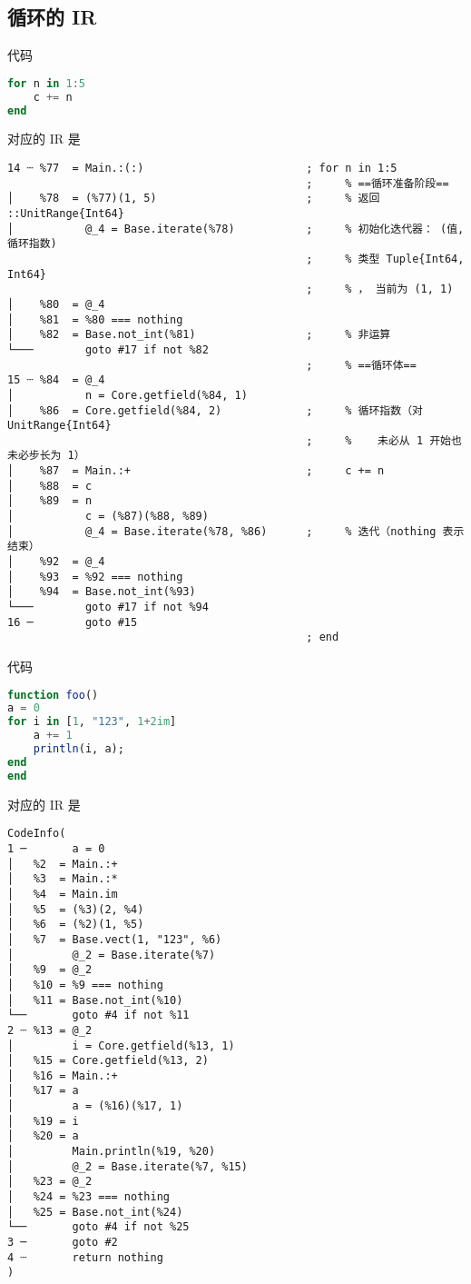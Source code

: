 \subsection{循环的 IR}
代码
\begin{lstlisting}[language=julia]
for n in 1:5
    c += n
end
\end{lstlisting}
对应的 IR 是
\begin{lstlisting}[language=none]
14 ┄ %77  = Main.:(:)                         ; for n in 1:5
                                              ;     % ==循环准备阶段==
│    %78  = (%77)(1, 5)                       ;     % 返回 ::UnitRange{Int64}
│           @_4 = Base.iterate(%78)           ;     % 初始化迭代器： (值, 循环指数)
                                              ;     % 类型 Tuple{Int64, Int64}
                                              ;     % ， 当前为 (1, 1)
│    %80  = @_4
│    %81  = %80 === nothing
│    %82  = Base.not_int(%81)                 ;     % 非运算
└───        goto #17 if not %82
                                              ;     % ==循环体==
15 ┄ %84  = @_4
│           n = Core.getfield(%84, 1)
│    %86  = Core.getfield(%84, 2)             ;     % 循环指数（对 UnitRange{Int64}
                                              ;     %    未必从 1 开始也未必步长为 1）
│    %87  = Main.:+                           ;     c += n
│    %88  = c
│    %89  = n
│           c = (%87)(%88, %89)
│           @_4 = Base.iterate(%78, %86)      ;     % 迭代（nothing 表示结束）
│    %92  = @_4
│    %93  = %92 === nothing
│    %94  = Base.not_int(%93)
└───        goto #17 if not %94
16 ─        goto #15
                                              ; end
\end{lstlisting}

代码
\begin{lstlisting}[language=julia]
function foo()
a = 0
for i in [1, "123", 1+2im]
    a += 1
    println(i, a);
end
end
\end{lstlisting}
对应的 IR 是
\begin{lstlisting}[language=none]
CodeInfo(
1 ─       a = 0
│   %2  = Main.:+
│   %3  = Main.:*
│   %4  = Main.im
│   %5  = (%3)(2, %4)
│   %6  = (%2)(1, %5)
│   %7  = Base.vect(1, "123", %6)
│         @_2 = Base.iterate(%7)
│   %9  = @_2
│   %10 = %9 === nothing
│   %11 = Base.not_int(%10)
└──       goto #4 if not %11
2 ┄ %13 = @_2
│         i = Core.getfield(%13, 1)
│   %15 = Core.getfield(%13, 2)
│   %16 = Main.:+
│   %17 = a
│         a = (%16)(%17, 1)
│   %19 = i
│   %20 = a
│         Main.println(%19, %20)
│         @_2 = Base.iterate(%7, %15)
│   %23 = @_2
│   %24 = %23 === nothing
│   %25 = Base.not_int(%24)
└──       goto #4 if not %25
3 ─       goto #2
4 ┄       return nothing
)
\end{lstlisting}
